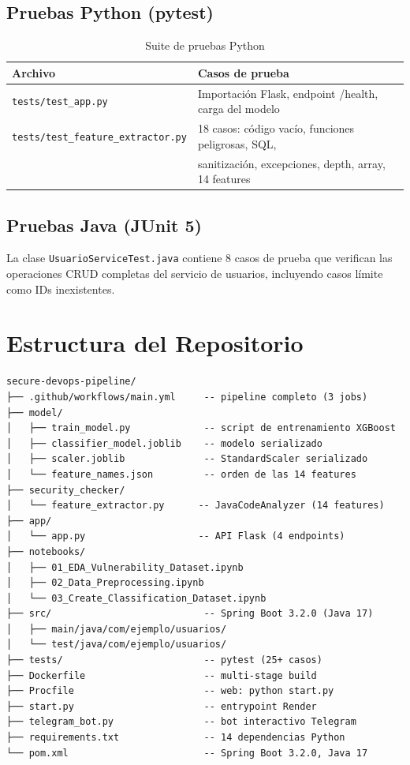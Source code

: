 \documentclass[12pt,a4paper]{article}
\begin{document}
\subsection{Pruebas Python (pytest)}

\begin{table}[H]
\centering
\begin{tabular}{@{}ll@{}}
\toprule
\textbf{Archivo}                   & \textbf{Casos de prueba} \\
\midrule
\texttt{tests/test\_app.py}        & Importación Flask, endpoint /health, carga del modelo \\
\texttt{tests/test\_feature\_extractor.py} & 18 casos: código vacío, funciones peligrosas, SQL, \\
                                    & sanitización, excepciones, depth, array, 14 features \\
\bottomrule
\end{tabular}
\caption{Suite de pruebas Python}
\end{table}

\subsection{Pruebas Java (JUnit 5)}

La clase \texttt{UsuarioServiceTest.java} contiene 8 casos de prueba que verifican las operaciones CRUD completas del servicio de usuarios, incluyendo casos límite como IDs inexistentes.

\section{Estructura del Repositorio}

\begin{verbatim}
secure-devops-pipeline/
├── .github/workflows/main.yml     -- pipeline completo (3 jobs)
├── model/
│   ├── train_model.py             -- script de entrenamiento XGBoost
│   ├── classifier_model.joblib    -- modelo serializado
│   ├── scaler.joblib              -- StandardScaler serializado
│   └── feature_names.json         -- orden de las 14 features
├── security_checker/
│   └── feature_extractor.py      -- JavaCodeAnalyzer (14 features)
├── app/
│   └── app.py                    -- API Flask (4 endpoints)
├── notebooks/
│   ├── 01_EDA_Vulnerability_Dataset.ipynb
│   ├── 02_Data_Preprocessing.ipynb
│   └── 03_Create_Classification_Dataset.ipynb
├── src/                           -- Spring Boot 3.2.0 (Java 17)
│   ├── main/java/com/ejemplo/usuarios/
│   └── test/java/com/ejemplo/usuarios/
├── tests/                         -- pytest (25+ casos)
├── Dockerfile                     -- multi-stage build
├── Procfile                       -- web: python start.py
├── start.py                       -- entrypoint Render
├── telegram_bot.py                -- bot interactivo Telegram
├── requirements.txt               -- 14 dependencias Python
└── pom.xml                        -- Spring Boot 3.2.0, Java 17
\end{verbatim}
\end{document}
